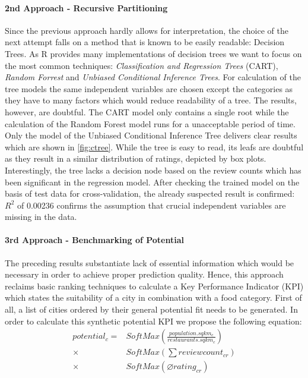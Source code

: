 \paragraph{2nd Approach - Recursive Partitioning}
Since the previous approach hardly allows for interpretation, the choice of the next attempt falls on a method that is known to be easily readable: Decision Trees. As R provides many implementations of decision trees we want to focus on the most common techniques: \textit{Classification and Regression Trees} (CART), \textit{Random Forrest} and \textit{Unbiased Conditional Inference Trees}.\newline
For calculation of the tree models the same independent variables are chosen except the categories as they have to many factors which would reduce readability of a tree. The results, however, are doubtful. The CART model only contains a single root while the calculation of the Random Forest model runs for a unacceptable period of time. Only the model of the Unbiased Conditional Inference Tree delivers clear results which are shown in \ref{fig:ctree}. 
While the tree is easy to read, its leafs are doubtful as they result in a similar distribution of ratings, depicted by box plots.
Interestingly, the tree lacks a decision node based on the review counts which has been significant in the regression model.
After checking the trained model on the basis of test data for cross-validation, the already suspected result is confirmed: $R^2$ of 0.00236 confirms the assumption that crucial independent variables are missing in the data.
 
\paragraph{3rd Approach - Benchmarking of Potential}
The preceding results substantiate lack of essential information which would be necessary in order to achieve proper prediction quality. Hence, this approach reclaims basic ranking techniques to calculate a Key Performance Indicator (KPI) which states the suitability of a city in combination with a food category.\newline
First of all, a list of cities ordered by their general potential fit needs to be generated. In order to calculate this synthetic potential KPI we propose the following equation:
\begin{equation}
\begin{aligned}
	potential_c = &SoftMax(\frac{population.sqkm_c}{restaurants.sqkm_c})  \\
	\times & SoftMax(\textstyle \sum reviewcount_{cr})  \\
	\times & SoftMax(\varnothing rating_{cr}) %
\end{aligned}
\label{eq:potential_benchmark}
\end{equation}

